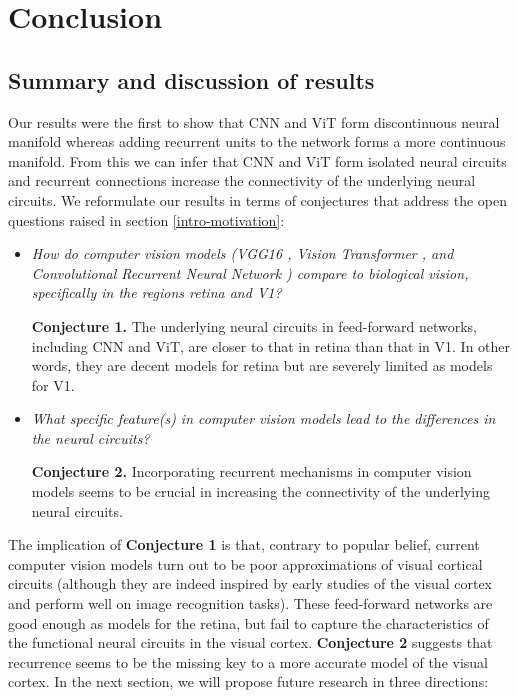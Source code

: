 \chapter{Conclusion}
\label{chapter-conclusion} 

\section{Summary and discussion of results}
Our results were the first to show that CNN and ViT form discontinuous neural manifold whereas adding recurrent units to the network forms a more continuous manifold. From this we can infer that  CNN and ViT form isolated neural circuits and recurrent connections increase the connectivity of the underlying neural circuits. We reformulate our results in terms of conjectures that address the open questions raised in section \ref{intro-motivation}:
\begin{itemize}[noitemsep, topsep=0pt]
    \item \textit{How do computer vision models (VGG16 \cite{vgg16_simonyan_very_2015}, Vision Transformer \cite{vit_dosovitskiy_image_2021}, and Convolutional Recurrent Neural Network \cite{convrnn_shi_end--end_2015}) compare to biological vision, specifically in the regions retina and V1?} 
    
    \textbf{Conjecture 1.} The underlying neural circuits in feed-forward networks, including CNN and ViT, are closer to that in retina than that in V1. In other words, they are decent models for retina but are severely limited as models for V1.
    
    \item \textit{What specific feature(s) in computer vision models lead to the differences in the neural circuits?}
    
    \textbf{Conjecture 2.} Incorporating recurrent mechanisms in computer vision models seems to be crucial in increasing the connectivity of the underlying neural circuits.
\end{itemize}

The implication of \textbf{Conjecture 1} is that, contrary to popular belief, current computer vision models turn out to be poor approximations of visual cortical circuits (although they are indeed inspired by early studies of the visual cortex and perform well on image recognition tasks). These feed-forward networks are good enough as models for the retina, but fail to capture the characteristics of the functional neural circuits in the visual cortex. \textbf{Conjecture 2} suggests that recurrence seems to be the missing key to a more accurate model of the visual cortex. In the next section, we will propose future research in three directions:

